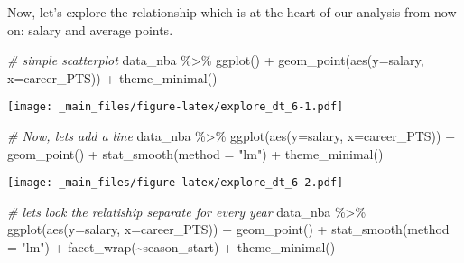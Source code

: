 \documentclass[
]{book}
\newenvironment{Shaded}{\begin{snugshade}}{\end{snugshade}}
\newcommand{\AttributeTok}[1]{\textcolor[rgb]{0.77,0.63,0.00}{#1}}
\newcommand{\AttributeTok}[1]{\textcolor[rgb]{0.13,0.29,0.53}{#1}}
\newcommand{\CommentTok}[1]{\textcolor[rgb]{0.56,0.35,0.01}{\textit{#1}}}
\newcommand{\FunctionTok}[1]{\textcolor[rgb]{0.00,0.00,0.00}{#1}}
\newcommand{\FunctionTok}[1]{\textcolor[rgb]{0.13,0.29,0.53}{\textbf{#1}}}
\newcommand{\NormalTok}[1]{#1}
\newcommand{\SpecialCharTok}[1]{\textcolor[rgb]{0.00,0.00,0.00}{#1}}
\newcommand{\SpecialCharTok}[1]{\textcolor[rgb]{0.81,0.36,0.00}{\textbf{#1}}}
\newcommand{\StringTok}[1]{\textcolor[rgb]{0.31,0.60,0.02}{#1}}
\begin{document}
Now, let's explore the relationship which is at the heart of our analysis from now on: salary and average points.

\begin{Shaded}
\begin{Highlighting}[]
\CommentTok{\# simple scatterplot}
\NormalTok{data\_nba }\SpecialCharTok{\%\textgreater{}\%} \FunctionTok{ggplot}\NormalTok{() }\SpecialCharTok{+}
\FunctionTok{geom\_point}\NormalTok{(}\FunctionTok{aes}\NormalTok{(}\AttributeTok{y=}\NormalTok{salary, }\AttributeTok{x=}\NormalTok{career\_PTS)) }\SpecialCharTok{+} 
  \FunctionTok{theme\_minimal}\NormalTok{()}
\end{Highlighting}
\end{Shaded}

\texttt{[image: \_main\_files/figure-latex/explore\_dt\_6-1.pdf]}

\begin{Shaded}
\begin{Highlighting}[]
\CommentTok{\# Now, let\textquotesingle{}s add a line}
\NormalTok{data\_nba }\SpecialCharTok{\%\textgreater{}\%} 
  \FunctionTok{ggplot}\NormalTok{(}\FunctionTok{aes}\NormalTok{(}\AttributeTok{y=}\NormalTok{salary, }\AttributeTok{x=}\NormalTok{career\_PTS)) }\SpecialCharTok{+}
    \FunctionTok{geom\_point}\NormalTok{() }\SpecialCharTok{+} 
     \FunctionTok{stat\_smooth}\NormalTok{(}\AttributeTok{method =} \StringTok{"lm"}\NormalTok{) }\SpecialCharTok{+} 
       \FunctionTok{theme\_minimal}\NormalTok{()}
\end{Highlighting}
\end{Shaded}

\texttt{[image: \_main\_files/figure-latex/explore\_dt\_6-2.pdf]}

\begin{Shaded}
\begin{Highlighting}[]
\CommentTok{\# let\textquotesingle{}s look the relatiship separate for every year}
\NormalTok{data\_nba }\SpecialCharTok{\%\textgreater{}\%} 
  \FunctionTok{ggplot}\NormalTok{(}\FunctionTok{aes}\NormalTok{(}\AttributeTok{y=}\NormalTok{salary, }\AttributeTok{x=}\NormalTok{career\_PTS)) }\SpecialCharTok{+}
    \FunctionTok{geom\_point}\NormalTok{() }\SpecialCharTok{+} 
     \FunctionTok{stat\_smooth}\NormalTok{(}\AttributeTok{method =} \StringTok{"lm"}\NormalTok{) }\SpecialCharTok{+} 
        \FunctionTok{facet\_wrap}\NormalTok{(}\SpecialCharTok{\textasciitilde{}}\NormalTok{season\_start) }\SpecialCharTok{+} 
       \FunctionTok{theme\_minimal}\NormalTok{()}
\end{Highlighting}
\end{Shaded}
\end{document}
